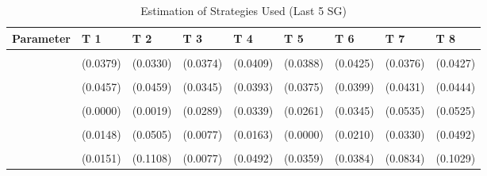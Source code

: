 \begin{table}[!h]
\centering
\caption{Estimation of Strategies Used (Last 5 SG)}
\centering
\begin{tabular}[t]{lllllllll}
\toprule
Parameter & T 1 & T 2 & T 3 & T 4 & T 5 & T 6 & T 7 & T 8\\
\midrule
\cellcolor{gray!10}{gamma} & \cellcolor{gray!10}{0.6025***} & \cellcolor{gray!10}{0.5096***} & \cellcolor{gray!10}{0.5515***} & \cellcolor{gray!10}{0.6177***} & \cellcolor{gray!10}{0.5789***} & \cellcolor{gray!10}{0.6733***} & \cellcolor{gray!10}{0.5843***} & \cellcolor{gray!10}{0.6178***}\\
 & (0.0379) & (0.0330) & (0.0374) & (0.0409) & (0.0388) & (0.0425) & (0.0376) & (0.0427)\\
\cellcolor{gray!10}{AD} & \cellcolor{gray!10}{0.4925***} & \cellcolor{gray!10}{0.3668***} & \cellcolor{gray!10}{0.7984***} & \cellcolor{gray!10}{0.6809***} & \cellcolor{gray!10}{0.7562***} & \cellcolor{gray!10}{0.7922***} & \cellcolor{gray!10}{0.3510***} & \cellcolor{gray!10}{0.3783***}\\
 & (0.0457) & (0.0459) & (0.0345) & (0.0393) & (0.0375) & (0.0399) & (0.0431) & (0.0444)\\
\cellcolor{gray!10}{AC} & \cellcolor{gray!10}{0.0000} & \cellcolor{gray!10}{0.0000} & \cellcolor{gray!10}{0.1008***} & \cellcolor{gray!10}{0.1809***} & \cellcolor{gray!10}{0.0925***} & \cellcolor{gray!10}{0.1191***} & \cellcolor{gray!10}{0.2068***} & \cellcolor{gray!10}{0.1549**}\\
\addlinespace
 & (0.0000) & (0.0019) & (0.0289) & (0.0339) & (0.0261) & (0.0345) & (0.0535) & (0.0525)\\
\cellcolor{gray!10}{G} & \cellcolor{gray!10}{0.1570***} & \cellcolor{gray!10}{0.0907} & \cellcolor{gray!10}{0.0152*} & \cellcolor{gray!10}{0.0000} & \cellcolor{gray!10}{0.0000} & \cellcolor{gray!10}{0.0242} & \cellcolor{gray!10}{0.0411} & \cellcolor{gray!10}{0.0930}\\
 & (0.0148) & (0.0505) & (0.0077) & (0.0163) & (0.0000) & (0.0210) & (0.0330) & (0.0492)\\
\cellcolor{gray!10}{TFT} & \cellcolor{gray!10}{0.1570***} & \cellcolor{gray!10}{0.3987***} & \cellcolor{gray!10}{0.0152*} & \cellcolor{gray!10}{0.1071*} & \cellcolor{gray!10}{0.1349***} & \cellcolor{gray!10}{0.0274} & \cellcolor{gray!10}{0.2422**} & \cellcolor{gray!10}{0.1608}\\
 & (0.0151) & (0.1108) & (0.0077) & (0.0492) & (0.0359) & (0.0384) & (0.0834) & (0.1029)\\

\end{tabular}
\end{table}
